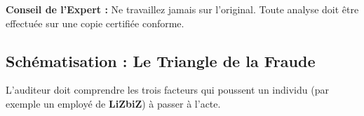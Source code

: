 \begin{boxalert}
\textbf{Conseil de l'Expert :} Ne travaillez jamais sur l'original. Toute analyse doit être effectuée sur une copie certifiée conforme.
\end{boxalert}

\subsection{Schématisation : Le Triangle de la Fraude}

L'auditeur doit comprendre les trois facteurs qui poussent un individu (par exemple un employé de \textbf{LiZbiZ}) à passer à l'acte.

\begin{center}
\end{center}
